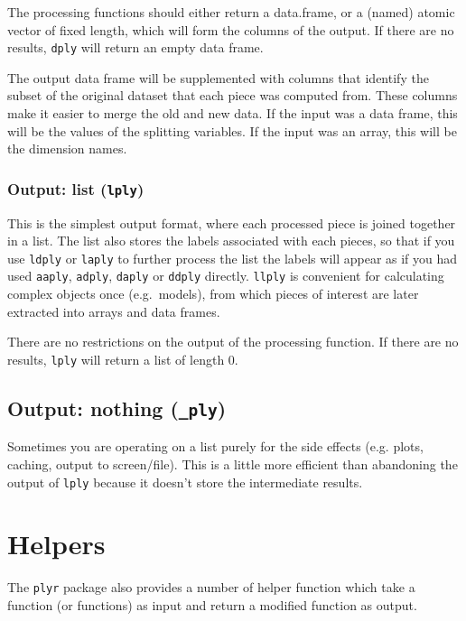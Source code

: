 \documentclass[letterpage]{scrartcl}
\begin{document}
The processing functions should either return a data.frame, or a (named) atomic vector of fixed length, which will form the columns of the output. If there are no results, {\tt *dply} will return an empty data frame.

The output data frame will be supplemented with columns that identify the subset of the original dataset that each piece was computed from.  These columns make it easier to merge the old and new data.  If the input was a data frame, this will be the values of the splitting variables.  If the input was an array, this will be the dimension names.

\subsubsection{Output: list ({\tt *lply})}

This is the simplest output format, where each processed piece is joined together in a list.  The list also stores the labels associated with each pieces, so that if you use {\tt ldply} or {\tt laply} to further process the list the labels will appear as if you had used {\tt aaply}, {\tt adply}, {\tt daply} or {\tt ddply} directly.  {\tt llply} is convenient for calculating complex objects once (e.g.\ models), from which pieces of interest are later extracted into arrays and data frames.

There are no restrictions on the output of the processing function.  If there are no results, {\tt *lply} will return a list of length 0.

\subsection{Output: nothing ({\tt *\_ply})}

Sometimes you are operating on a list purely for the side effects (e.g. plots, caching, output to screen/file).  This is a little more efficient than abandoning the output of {\tt *lply} because it doesn't store the intermediate results.

\section{Helpers}
\label{sec:helpers}

The {\tt plyr} package also provides a number of helper function which take a function (or functions) as input and return a modified function as output.  
\end{document}
